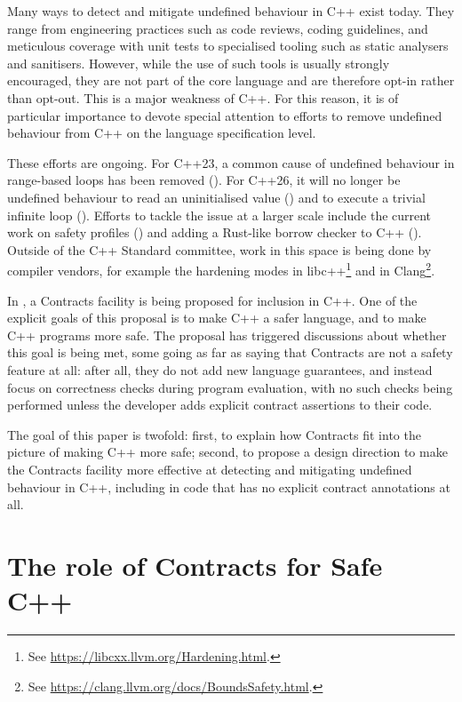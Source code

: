 Many ways to detect and mitigate undefined behaviour in C++ exist today. They range from engineering practices such as code reviews, coding guidelines, and meticulous coverage with unit tests to specialised tooling such as static analysers and sanitisers. However, while the use of such tools is usually strongly encouraged, they are not part of the core language and are therefore opt-in rather than opt-out. This is a major weakness of C++. For this reason, it is of particular importance to devote special attention to efforts to remove undefined behaviour from C++ on the language specification level.

These efforts are ongoing. For C++23, a common cause of undefined behaviour in range-based  loops has been removed (\cite{P2012R2}). For C++26, it will no longer be undefined behaviour to read an uninitialised value (\cite{P2795R5}) and to execute a trivial infinite loop (\cite{P2809R3}). Efforts to tackle the issue at a larger scale include the current work on safety profiles (\cite{P3274R0}) and adding a Rust-like borrow checker to C++ (\cite{P3390R0}). Outside of the C++ Standard committee, work in this space is being done by compiler vendors, for example the hardening modes in libc++\footnote{See \href{https://libcxx.llvm.org/Hardening.html}{https://libcxx.llvm.org/Hardening.html}.} and  in Clang\footnote{See \href{https://clang.llvm.org/docs/BoundsSafety.html}{https://clang.llvm.org/docs/BoundsSafety.html}.}.

In \cite{P2900R9}, a Contracts facility is being proposed for inclusion in C++. One of the explicit goals of this proposal is to make C++ a safer language, and to make C++ programs more safe. The proposal has triggered discussions about whether this goal is being met, some going as far as saying that Contracts are not a safety feature at all: after all, they do not add new language guarantees, and instead focus on correctness checks during program evaluation, with no such checks being performed unless the developer adds explicit contract assertions to their code.

The goal of this paper is twofold: first, to explain how Contracts fit into the picture of making C++ more safe; second, to propose a design direction to make the Contracts facility more effective at detecting and mitigating undefined behaviour in C++, including in code that has no explicit contract annotations at all.

\section{The role of Contracts for Safe C++}
\label{role}

